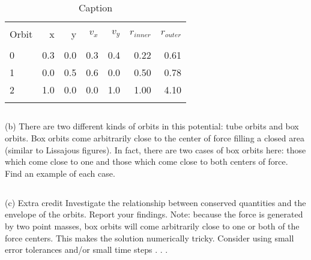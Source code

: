 \begin{table}[]
    \centering
    \begin{tabular}{lrrrrrr}
    \toprule \\
    Orbit &    x &    y &  $v_x$ &  $v_y$ &  $r_{inner}$ &  $r_{outer}$\\
    \midrule \\
    0 &  0.3 &  0.0 &  0.3 &  0.4 &    0.22 &   0.61 \\
    1 &  0.0 &  0.5 &  0.6 &  0.0 &    0.50 &   0.78 \\
    2 &  1.0 &  0.0 &  0.0 &  1.0 &    1.00 &   4.10 \\
    \bottomrule\\
    \end{tabular}
    \caption{Caption}
    \label{tab:my_label}
\end{table}

\subsection{}
(b) There are two different kinds of orbits in this potential: tube orbits
and box orbits. Box orbits come arbitrarily close to the center of
force filling a closed area (similar to Lissajous figures). In fact,
there are two cases of box orbits here: those which come close to
one and those which come close to both centers of force. Find an
example of each case.
\subsection{}
(c) Extra credit Investigate the relationship between conserved quantities and the envelope of the orbits. Report your findings.
Note: because the force is generated by two point masses, box orbits
will come arbitrarily close to one or both of the force centers. This
makes the solution numerically tricky. Consider using small error tolerances and/or small time steps . . .